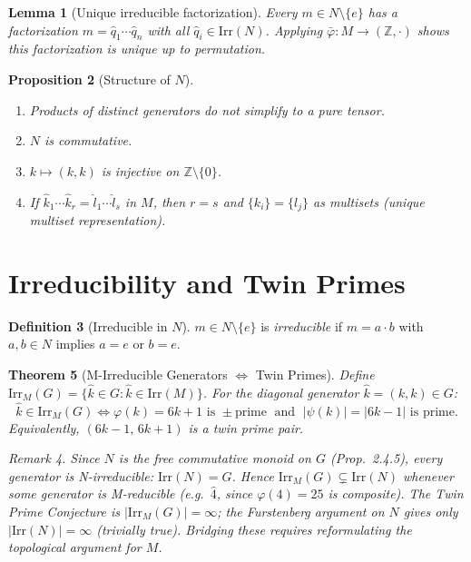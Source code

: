 \documentclass[12pt,a4paper]{amsart}
\theoremstyle{plain}
\newtheorem{theorem}{Theorem}[section]
\newtheorem{lemma}[theorem]{Lemma}
\newtheorem{proposition}[theorem]{Proposition}
\theoremstyle{definition}
\newtheorem{definition}[theorem]{Definition}
\theoremstyle{remark}
\newtheorem{remark}[theorem]{Remark}
\newcommand{\Irr}{\mathrm{Irr}}
\newcommand{\IrrM}{\mathrm{Irr}_M}
\newcommand{\qhat}[1]{\widehat{#1}}
\newcommand{\bbZ}{\mathbb{Z}}
\begin{document}
\begin{lemma}[Unique irreducible factorization]
\label{lem:ufd}
Every $m \in N \setminus \{e\}$ has a factorization
$m = \qhat{q}_1 \cdots \qhat{q}_n$ with all $\qhat{q}_i \in \Irr(N)$.
Applying $\bar{\varphi}: M \to (\bbZ,\cdot)$ shows this factorization is
unique up to permutation.
\end{lemma}

\begin{proposition}[Structure of $N$]
\label{prop:nstruct}
\begin{enumerate}[label=(\alph*),nosep]
  \item Products of distinct generators do not simplify to a pure tensor.
  \item $N$ is commutative.
  \item $k \mapsto (k,k)$ is injective on $\bbZ \setminus \{0\}$.
  \item If $\qhat{k}_1 \cdots \qhat{k}_r = \qhat{l}_1 \cdots \qhat{l}_s$
        in $M$, then $r = s$ and $\{k_i\} = \{l_j\}$ as multisets
        \emph{(unique multiset representation)}.
\end{enumerate}
\end{proposition}

\section{Irreducibility and Twin Primes}

\begin{definition}[Irreducible in $N$]
$m \in N \setminus \{e\}$ is \emph{irreducible} if $m = a \cdot b$ with
$a, b \in N$ implies $a = e$ or $b = e$.
\end{definition}

\begin{theorem}[M-Irreducible Generators $\iff$ Twin Primes]
\label{thm:irred-twin}
Define $\IrrM(G) = \{\qhat{k} \in G : \qhat{k} \in \Irr(M)\}$.
For the diagonal generator $\qhat{k} = (k,k) \in G$:
$$\qhat{k} \in \IrrM(G) \iff
  \varphi(k) = 6k+1 \text{ is } \pm\text{prime}
  \;\text{ and }\;
  |\psi(k)| = |6k-1| \text{ is prime.}$$
Equivalently, $(6k-1,\, 6k+1)$ is a twin prime pair.

\begin{remark}
Since $N$ is the free commutative monoid on $G$ (Prop.~2.4.5), every
generator is N-irreducible: $\Irr(N) = G$.
Hence $\IrrM(G) \subsetneq \Irr(N)$ whenever some generator is
M-reducible (e.g.\ $\qhat{4}$, since $\varphi(4)=25$ is composite).
The Twin Prime Conjecture is $|\IrrM(G)| = \infty$; the Furstenberg
argument on $N$ gives only $|\Irr(N)| = \infty$ (trivially true).
Bridging these requires reformulating the topological argument for $M$.
\end{remark}
\end{theorem}
\end{document}
